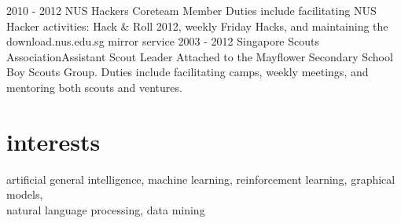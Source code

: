 \documentclass[]{friggeri-cv}
\begin{document}
\begin{entrylist}
	\entry
	{2010 - 2012}
	{NUS Hackers}
	{Coreteam Member}
	{Duties include facilitating NUS Hacker activities: Hack \& Roll 2012, 
weekly Friday Hacks, and maintaining the download.nus.edu.sg mirror service}
	\entry
	{2003 - 2012}
	{Singapore Scouts Association}{Assistant Scout Leader}
	{Attached to the Mayflower Secondary School Boy Scouts Group. Duties include 
	facilitating camps, weekly meetings, and mentoring both scouts and 
ventures.}
\end{entrylist}
\section{interests}
artificial general intelligence, machine learning, reinforcement learning,
graphical models,\\ natural language processing, data mining
\end{document}
